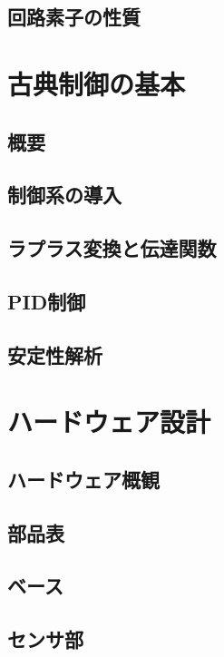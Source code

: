 \documentclass{ltjsreport}
\begin{document}
\section{回路素子の性質}




\chapter{古典制御の基本}

\section{概要}

\section{制御系の導入}

\section{ラプラス変換と伝達関数}

\section{PID制御}

\section{安定性解析}



\chapter{ハードウェア設計}
\section{ハードウェア概観}

\section{部品表}

\section{ベース}

\section{センサ部}
\end{document}
